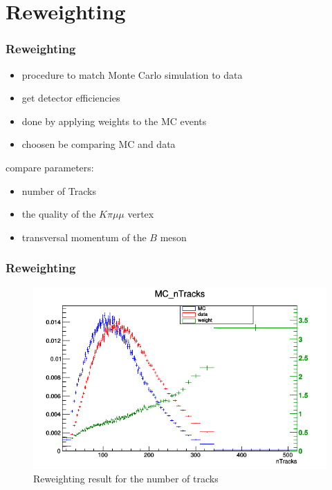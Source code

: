 \documentclass{beamer}
\begin{document}

\section{Reweighting}

\begin{frame}
  \frametitle{Reweighting}

    \begin{itemize}
      \item procedure to match Monte Carlo simulation to data
      \item get detector efficiencies
      \item done by applying weights to the MC events
      \item choosen be comparing MC and data
    \end{itemize}
compare parameters:
\begin{itemize}
  \item number of Tracks
  \item the quality of the $K \pi \mu \mu$ vertex
  \item transversal momentum of the $B$ meson
\end{itemize}

\end{frame}

\begin{frame}
  \frametitle{Reweighting}

  \begin{figure}
   \includegraphics[width=0.8\linewidth]{figures/nTracksw}
   \caption{Reweighting result for the number of tracks}
  \end{figure}


\end{frame}

\end{document}
